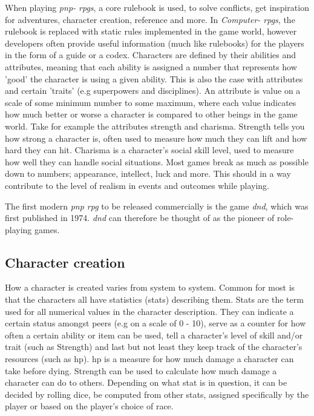 When playing \emph{\ac{pnp}- \ac{rpgs}}, a core rulebook is used, to solve conflicts, get inspiration for adventures, character creation, reference and more. In \emph{Computer- \ac{rpgs}}, the rulebook is replaced with static rules implemented in the game world, however developers often provide useful information (much like rulebooks) for the players in the form of a guide or a codex.
Characters are defined by their abilities and attributes, meaning that each ability is assigned a number that represents how 'good' the character is using a given ability. This is also the case with attributes and certain 'traits' (e.g superpowers and disciplines). An attribute is value on a scale of some minimum number to some maximum, where each value indicates how much better or worse a character is compared to other beings in the game world. Take for example the attributes strength and charisma. Strength tells you how strong a character is, often used to measure how much they can lift and how hard they can hit. Charisma is a character's social skill level, used to measure how well they can handle social situations. Most games break as much as possible down to numbers; appearance, intellect, luck and more.
This should in a way contribute to the level of realism in events and outcomes while playing.

The first modern \emph{\ac{pnp} \ac{rpg}} to be released commercially is the game \emph{\ac{dnd}}, which was first published in 1974.\cite{wikidnd}
\emph{\ac{dnd}} can therefore be thought of as the pioneer of role-playing games.

\subsection{Character creation}

How a character is created varies from system to system. Common for most is that the characters all have statistics (stats) describing them.
Stats are the term used for all numerical values in the character description. They can indicate a certain status amongst peers (e.g on a scale of 0 - 10), serve as a counter for how often a certain ability or item can be used, tell a character's level of skill and/or trait (such as Strength) and last but not least they keep track of the character's resources (such as \ac{hp}).
\ac{hp} is a measure for how much damage a character can take before dying. Strength can be used to calculate how much damage a character can do to others. Depending on what stat is in question, it can be decided by rolling dice, be computed from other stats, assigned specifically by the player or based on the player's choice of race.

